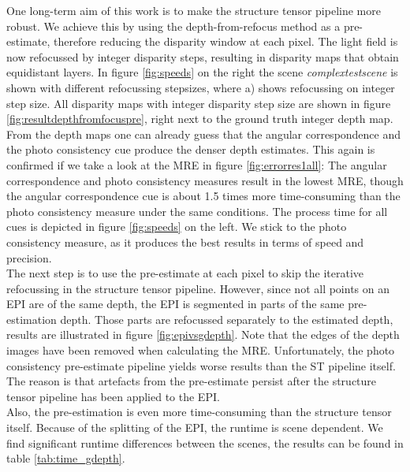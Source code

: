 \documentclass  [
  paper    = a4,
  BCOR     = 10mm,
  twoside,
  fontsize = 12pt,
  fleqn,
  toc      = bibnumbered,
  toc      = listofnumbered,
  numbers  = noendperiod,
  headings = normal,
  listof   = leveldown,
  version  = 3.03
]                                       {scrreprt}
\begin{document}
	One long-term aim of this work is to make the structure tensor pipeline more robust. We achieve this by using the depth-from-refocus method as a pre-estimate, therefore reducing the disparity window at each pixel. The light field is now refocussed by integer disparity steps, resulting in disparity maps that obtain equidistant layers. In figure \ref{fig:speeds} on the right the scene \textit{complextestscene} is shown with different refocussing stepsizes, where a) shows refocussing on integer step size.
	 All disparity maps with integer disparity step size are shown in figure \ref{fig:resultdepthfromfocuspre}, right next to the ground truth integer depth map. From the depth maps one can already guess that the angular correspondence and the photo consistency cue produce the denser depth estimates. This again is confirmed if we take a look at the MRE in figure \ref{fig:errorres1all}: The angular correspondence and photo consistency measures result in the lowest MRE, though the angular correspondence cue is about 1.5 times more time-consuming than the photo consistency measure under the same conditions. The process time for all cues is depicted in figure \ref{fig:speeds} on the left.
 	We stick to the photo consistency measure, as it produces the best results in terms of speed and precision.\\
 	The next step is to use the pre-estimate at each pixel to skip the iterative refocussing in the structure tensor pipeline. However, since not all points on an EPI are of the same depth, the EPI is segmented in parts of the same pre-estimation depth. Those parts are refocussed separately to the estimated depth, results are illustrated in figure \ref{fig:epivsgdepth}. Note that the edges of the depth images have been removed when calculating the MRE. 
 	Unfortunately, the photo consistency pre-estimate pipeline yields worse results than the ST pipeline itself. The reason is that artefacts from the pre-estimate persist after the structure tensor pipeline has been applied to the EPI.\\
 	Also, the pre-estimation is even more time-consuming than the structure tensor itself. Because of the splitting of the EPI, the runtime is scene dependent. We find significant runtime differences between the scenes, the results can be found in table \ref{tab:time_gdepth}. 
\end{document}
